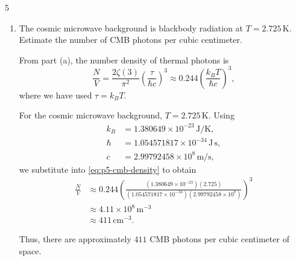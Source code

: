 \documentclass[11pt]{article}
\begin{document}
\begin{problem}{5}
\begin{enumerate}[label=(\alph*)]
\begin{proof}
\begin{equation}
\begin{aligned}
      &= \frac{2\zeta(3)}{\pi^2} V \left( \frac{\tau}{\hbar c} \right)^3,
    \end{aligned}
  \end{equation}
  as desired.
        \end{proof}
  \item The cosmic microwave background is blackbody radiation at \( T = 2.725\,\mathrm{K} \).
  Estimate the number of CMB photons per cubic centimeter.
        \begin{answer}
    From part (a), the number density of thermal photons is
    \begin{equation}
        \label{eq:p5-cmb-density}
        \frac{N}{V}
        = \frac{2\zeta(3)}{\pi^2}
        \left(\frac{\tau}{\hbar c}\right)^3
        \approx 0.244\left(\frac{k_B T}{\hbar c}\right)^3,
    \end{equation}
    where we have used \( \tau = k_B T \).

    For the cosmic microwave background, \( T = 2.725\,\mathrm{K} \).
    Using
    \begin{equation}
        \label{eq:p5-constants}
        \begin{aligned}
            k_B &= 1.380649 \times 10^{-23}\,\mathrm{J/K},\\
            \hbar &= 1.054571817 \times 10^{-34}\,\mathrm{J\,s},\\
            c &= 2.99792458 \times 10^8\,\mathrm{m/s},
        \end{aligned}
    \end{equation}
    we substitute into \cref{eq:p5-cmb-density} to obtain
    \begin{equation}
        \label{eq:p5-cmb-result}
        \begin{aligned}
            \frac{N}{V}
            &\approx 0.244
            \left(
                \frac{
                    (1.380649 \times 10^{-23})(2.725)
                }{
                    (1.054571817 \times 10^{-34})
                    (2.99792458 \times 10^8)
                }
            \right)^3\\
            &\approx 4.11 \times 10^8\,\mathrm{m^{-3}}\\
            &\approx \boxed{411\,\mathrm{cm^{-3}}}.
        \end{aligned}
    \end{equation}

    Thus, there are approximately \( 411 \) CMB photons per cubic
    centimeter of space.
        \end{answer}


\end{enumerate}
\end{problem}
\end{document}

